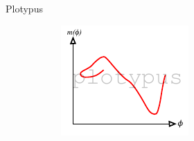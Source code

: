 \documentclass{beamer}
\begin{document}
\begin{frame}{Plotypus}
\begin{figure}
  \centering
  \begin{subfigure}[c]{0.2\textwidth}
    \includegraphics[width=\textwidth]{img/plotypus}


\end{subfigure}
\end{figure}
\end{frame}
\end{document}
